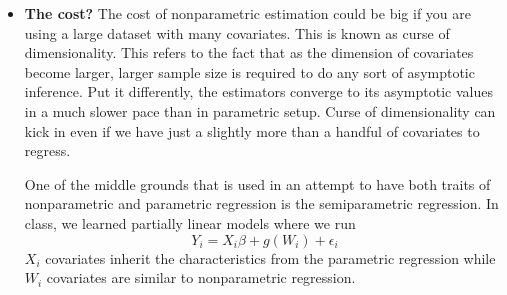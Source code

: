 \documentclass[12pt]{article}
\theoremstyle{definition}
\theoremstyle{property}
\theoremstyle{assumption}
\theoremstyle{example}
\theoremstyle{comment}
\begin{document}
\begin{itemize}
\item \textbf{The cost?} The cost of nonparametric estimation could be big if you are using a large dataset with many covariates. This is known as curse of dimensionality. This refers to the fact that as the dimension of covariates become larger, larger sample size is required to do any sort of asymptotic inference. Put it differently, the estimators converge to its asymptotic values in a much slower pace than in parametric setup. Curse of dimensionality can kick in even if we have just a slightly more than a handful of covariates to regress. \par
One of the middle grounds that is used in an attempt to have both traits of nonparametric and parametric regression is the semiparametric regression. In class, we learned partially linear models where we run
\[
Y_i = X_i\beta + g(W_i)+\epsilon_i
\]
$X_i$ covariates inherit the characteristics from the parametric regression while $W_i$ covariates are similar to nonparametric regression. 
\end{itemize}
\end{document}
